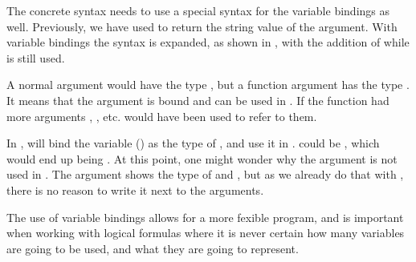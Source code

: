 The concrete syntax needs to use a special syntax for the variable bindings as well. Previously, we have used  to return the string value of the argument. With variable bindings the syntax is expanded, as shown in , with the addition of  while  is still used.


A normal argument would have the type , but a function argument has the type . It means that the argument  is bound and can be used in . If the function had more arguments , , etc. would have been used to refer to them.

In ,  will bind the variable  () as the type of , and use it in .  could be , which would end up being . At this point, one might wonder why the  argument is not used in . The  argument shows the type of  and , but as we already do that with , there is no reason to write it next to the arguments.

The use of variable bindings allows for a more fexible program, and is important when working with logical formulas where it is never certain how many variables are going to be used, and what they are going to represent.